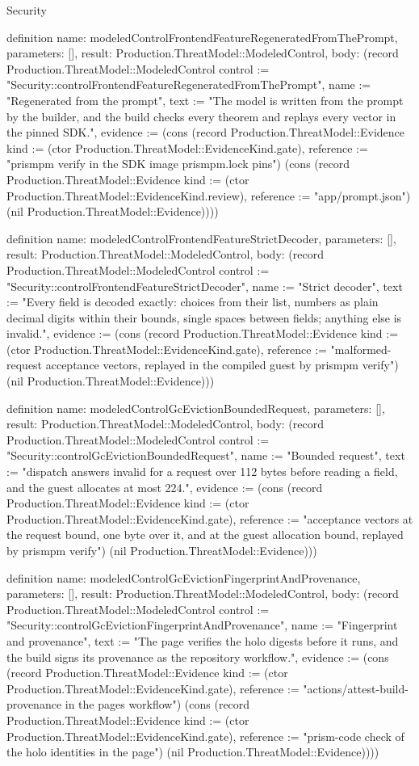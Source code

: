 \begin{lexlean}{Security}
\begin{semanticmodule}
definition{
  name: modeledControlFrontendFeatureRegeneratedFromThePrompt,
  parameters: [],
  result: Production.ThreatModel::ModeledControl,
  body: (record Production.ThreatModel::ModeledControl {control := "Security::controlFrontendFeatureRegeneratedFromThePrompt", name := "Regenerated from the prompt", text := "The model is written from the prompt by the builder, and the build checks every theorem and replays every vector in the pinned SDK.", evidence := (cons (record Production.ThreatModel::Evidence {kind := (ctor Production.ThreatModel::EvidenceKind.gate), reference := "prismpm verify in the SDK image prismpm.lock pins"}) (cons (record Production.ThreatModel::Evidence {kind := (ctor Production.ThreatModel::EvidenceKind.review), reference := "app/prompt.json"}) (nil Production.ThreatModel::Evidence)))})
}

definition{
  name: modeledControlFrontendFeatureStrictDecoder,
  parameters: [],
  result: Production.ThreatModel::ModeledControl,
  body: (record Production.ThreatModel::ModeledControl {control := "Security::controlFrontendFeatureStrictDecoder", name := "Strict decoder", text := "Every field is decoded exactly: choices from their list, numbers as plain decimal digits within their bounds, single spaces between fields; anything else is invalid.", evidence := (cons (record Production.ThreatModel::Evidence {kind := (ctor Production.ThreatModel::EvidenceKind.gate), reference := "malformed-request acceptance vectors, replayed in the compiled guest by prismpm verify"}) (nil Production.ThreatModel::Evidence))})
}

definition{
  name: modeledControlGcEvictionBoundedRequest,
  parameters: [],
  result: Production.ThreatModel::ModeledControl,
  body: (record Production.ThreatModel::ModeledControl {control := "Security::controlGcEvictionBoundedRequest", name := "Bounded request", text := "dispatch answers invalid for a request over 112 bytes before reading a field, and the guest allocates at most 224.", evidence := (cons (record Production.ThreatModel::Evidence {kind := (ctor Production.ThreatModel::EvidenceKind.gate), reference := "acceptance vectors at the request bound, one byte over it, and at the guest allocation bound, replayed by prismpm verify"}) (nil Production.ThreatModel::Evidence))})
}

definition{
  name: modeledControlGcEvictionFingerprintAndProvenance,
  parameters: [],
  result: Production.ThreatModel::ModeledControl,
  body: (record Production.ThreatModel::ModeledControl {control := "Security::controlGcEvictionFingerprintAndProvenance", name := "Fingerprint and provenance", text := "The page verifies the holo digests before it runs, and the build signs its provenance as the repository workflow.", evidence := (cons (record Production.ThreatModel::Evidence {kind := (ctor Production.ThreatModel::EvidenceKind.gate), reference := "actions/attest-build-provenance in the pages workflow"}) (cons (record Production.ThreatModel::Evidence {kind := (ctor Production.ThreatModel::EvidenceKind.gate), reference := "prism-code check of the holo identities in the page"}) (nil Production.ThreatModel::Evidence)))})
}


\end{semanticmodule}
\end{lexlean}
